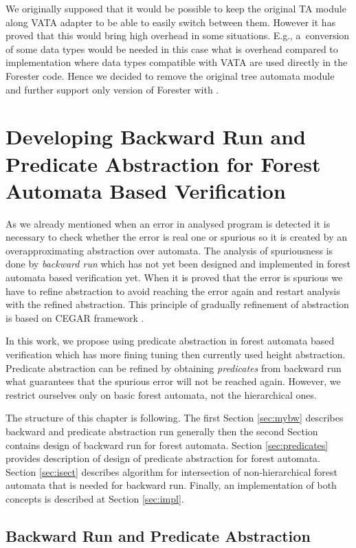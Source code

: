 We originally supposed that it would be possible to keep the original TA module along VATA adapter
to be able to easily switch between them.
However it has proved that this would bring high overhead in some situations.
E.g., a~conversion of some data types would be needed in this case
what is overhead compared to implementation where data types compatible with VATA are used directly in the Forester code.
Hence we decided to remove the original tree automata module and further support only version of Forester with \vata.

\chapter{Developing Backward Run and Predicate Abstraction for Forest Automata Based Verification}
\label{ch:backward}

As we already mentioned when an error in analysed program is detected
it is necessary to check whether the error is real one or spurious
so it is created by an overapproximating abstraction over automata.
The analysis of spuriousness is done by \emph{backward run} which has not
yet been designed and implemented in forest automata based verification yet.
When it is proved that the error is spurious we have to refine abstraction to avoid
reaching the error again and restart analysis with the refined abstraction.
This principle of gradually refinement of abstraction is based on CEGAR framework \cite{cegar}.

In this work, we propose using predicate abstraction \cite{artmc} in forest automata based verification
which has more fining tuning then currently used height abstraction.
Predicate abstraction can be refined by obtaining \emph{predicates} from backward run
what guarantees that the spurious error will not be reached again.
However, we restrict ourselves only on basic forest automata, not the hierarchical ones.

The structure of this chapter is following.
The first Section \ref{sec:mybw} describes backward and predicate abstraction run generally
then the second Section contains design of backward run for forest automata.
Section \ref{sec:predicates} provides description of design of
predicate abstraction for forest automata.
Section \ref{sec:isect} describes algorithm for intersection of non-hierarchical forest automata
that is needed for backward run.
Finally, an implementation of both concepts is described at Section \ref{sec:impl}.

\section{Backward Run and Predicate Abstraction}
\label{sec:br}

